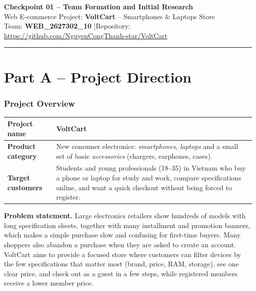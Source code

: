 \documentclass[12pt,a4paper]{article}
\newcommand{\TeamName}{WEB\_2627302\_10}
\newcommand{\ProjectName}{VoltCart}
\newcommand{\RepoURL}{\url{https://github.com/NguyenCongThanh-star/VoltCart}}
\begin{document}
\begin{center}
  {\Large\bfseries Checkpoint 01 -- Team Formation and Initial Research}\\[0.4em]
  {\large Web E-commerce Project: \textbf{\ProjectName} -- Smartphones \& Laptops Store}\\[0.3em]
  Team: \textbf{\TeamName} \quad|\quad Repository: \RepoURL
\end{center}
\vspace{-0.5em}
\noindent\rule{\linewidth}{0.4pt}

\part*{\large Part A -- Project Direction}

\section{Project Overview}

\begin{tabularx}{\linewidth}{|l|Y|}
\hline
\textbf{Project name}     & \ProjectName \\ \hline
\textbf{Product category} & New consumer electronics: \emph{smartphones}, \emph{laptops}
                            and a small set of basic \emph{accessories} (chargers, earphones, cases). \\ \hline
\textbf{Target customers} & Students and young professionals (18--35) in Vietnam who buy a phone or
                            laptop for study and work, compare specifications online, and want a quick
                            checkout without being forced to register. \\ \hline
\end{tabularx}

\textbf{Problem statement.}
Large electronics retailers show hundreds of models with long specification sheets, together with
many installment and promotion banners, which makes a simple purchase slow and confusing for
first-time buyers. Many shoppers also abandon a purchase when they are asked to create an account.
\ProjectName{} aims to provide a focused store where customers can filter devices by the few
specifications that matter most (brand, price, RAM, storage), see one clear price, and check out as
a guest in a few steps, while registered members receive a lower member price.
\end{document}
